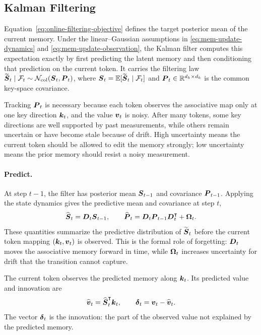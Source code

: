 \documentclass[11pt,letterpaper,logo]{yalearxiv}
\begin{document}
\subsection{Kalman Filtering}
\label{sec:kalman-filtering}

Equation~\eqref{eq:online-filtering-objective} defines the target posterior mean of the current
memory. Under the linear--Gaussian assumptions in \eqref{eq:mem-update-dynamics} and
\eqref{eq:mem-update-observation}, the Kalman filter computes this expectation exactly by first
predicting the latent memory and then conditioning that prediction on the current token. It carries
the filtering law
$\widetilde{\boldsymbol{S}}_t\mid\mathcal{F}_t
\sim\mathcal N_{\mathrm{col}}(\boldsymbol{S}_t,\boldsymbol{P}_t)$, where
$\boldsymbol{S}_t=\mathbb{E}[\widetilde{\boldsymbol{S}}_t\mid\mathcal{F}_t]$ and
$\boldsymbol{P}_t\in\mathbb{R}^{d_k\times d_k}$ is the common key-space covariance.

Tracking $\boldsymbol{P}_t$ is necessary because each token observes the associative map only at one key
direction $\boldsymbol{k}_t$, and the value $\boldsymbol{v}_t$ is noisy. After many tokens, some key directions are
well supported by past measurements, while others remain uncertain or have become stale
because of drift. High uncertainty means the current token should be allowed to edit the
memory strongly; low uncertainty means the prior memory should resist a noisy measurement.

\paragraph{Predict.}
At step $t-1$, the filter has posterior mean $\boldsymbol{S}_{t-1}$ and covariance $\boldsymbol{P}_{t-1}$.
Applying the state dynamics gives the predictive mean and covariance at step $t$,
\begin{equation}
  \widehat{\boldsymbol{S}}_t = \boldsymbol{D}_t \boldsymbol{S}_{t-1},
  \qquad
  \widehat{\boldsymbol{P}}_t = \boldsymbol{D}_t\boldsymbol{P}_{t-1}\boldsymbol{D}_t^{\intercal}+\boldsymbol{\Omega}_t .
  \label{eq:kalman-predict}
\end{equation}
These quantities summarize the predictive distribution of $\widetilde{\boldsymbol{S}}_t$ before the current
token mapping $(\boldsymbol{k}_t,\boldsymbol{v}_t)$ is observed. This is
the formal role of forgetting: $\boldsymbol{D}_t$ moves the associative memory forward in time, while
$\boldsymbol{\Omega}_t$ increases uncertainty for drift that the transition cannot capture.

The current token observes the predicted memory along $\boldsymbol{k}_t$. Its predicted value and
innovation are
\begin{equation}
  \widehat{\boldsymbol{v}}_t = \widehat{\boldsymbol{S}}_t^{\intercal}\boldsymbol{k}_t,
  \qquad
  \boldsymbol{\delta}_t = \boldsymbol{v}_t-\widehat{\boldsymbol{v}}_t .
  \label{eq:kalman-innovation}
\end{equation}
The vector $\boldsymbol{\delta}_t$ is the innovation: the part of the observed value not explained by the
predicted memory.
\end{document}
